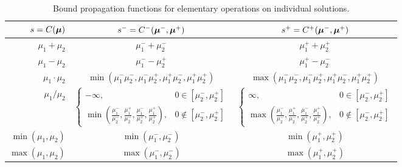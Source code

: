 \documentclass{article}[12pt]
\begin{document}
\begin{table}[H]
\begin{tabular}{r  c  c}
    $s=C(\boldsymbol{\mu})$ & $s^- = C^-(\boldsymbol{\mu}^-,\boldsymbol{\mu}^+)$ & $s^+ = C^+(\boldsymbol{\mu}^-,\boldsymbol{\mu}^+)$ \\
    \hline
    $\mu_1+\mu_2$ & $\mu_1^-+\mu_2^-$ & $\mu_1^++\mu_2^+$ \\
    $\mu_1-\mu_2$ & $\mu_1^--\mu_2^+$ & $\mu_1^+-\mu_2^-$ \\
    $\mu_1 \cdot \mu_2$ & $\min(\mu_1^-\mu_2^-,\mu_1^-\mu_2^+,\mu_1^+\mu_2^-,\mu_1^+\mu_2^+)$ & $\max(\mu_1^-\mu_2^-,\mu_1^-\mu_2^+,\mu_1^+\mu_2^-,\mu_1^+\mu_2^+)$ \\
    $\mu_1 / \mu_2$ & $\begin{cases} -\infty, & 0 \in [\mu_2^-,\mu_2^+] \\ \min\left(\frac{\mu_1^-}{\mu_2^-},\frac{\mu_1^+}{\mu_2^-},\frac{\mu_1^-}{\mu_2^+},\frac{\mu_1^+}{\mu_2^+}\right), & 0 \notin [\mu_2^-,\mu_2^+] \end{cases}$ & $\begin{cases} \infty, & 0 \in [\mu_2^-,\mu_2^+] \\ \max\left(\frac{\mu_1^-}{\mu_2^-},\frac{\mu_1^+}{\mu_2^-},\frac{\mu_1^-}{\mu_2^+},\frac{\mu_1^+}{\mu_2^+}\right), & 0 \notin [\mu_2^-,\mu_2^+] \end{cases}$ \\
    $\min(\mu_1,\mu_2)$ & $\min(\mu_1^-,\mu_2^-)$ & $\min(\mu_1^+,\mu_2^+)$ \\
    $\max(\mu_1,\mu_2)$ & $\max(\mu_1^-,\mu_2^-)$ & $\max(\mu_1^+,\mu_2^+)$ \\
    \hline
\end{tabular}
\caption{Bound propagation functions for elementary operations on individual solutions.}
\label{table:elementary_ops_Cpm}
\end{table}

\end{document}
